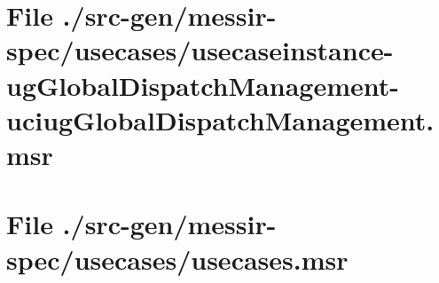 \section[File /.../usecaseinstance-ugGlobalDispatchManagement-uciugGlobalDispatchManagement.msr]{File ./src-gen/messir-spec/usecases/usecaseinstance-ugGlobalDispatchManagement-uciugGlobalDispatchManagement.msr}
\scriptsize

\normalsize
	
\section[File /src-gen/messir-spec/usecases/usecases.msr]{File ./src-gen/messir-spec/usecases/usecases.msr}
\scriptsize

\normalsize
	
